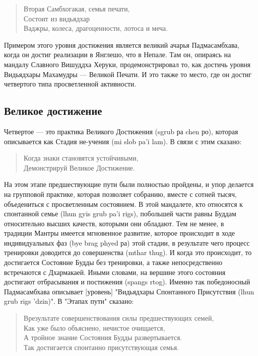 \begin{verse}
Вторая Самбхогакая, семья печати,\\
Состоит из видьядхар\\
Ваджры, колеса, драгоценности, лотоса и меча.
\end{verse}

Примером этого уровня достижения является великий ачарья Падмасамбхава, когда
он достиг реализации в Янглешо, что в Непале. Там он, опираясь на мандалу Славного
Вишуддха Херуки, продемонстрировал то, как достичь уровня Видьядхары Махамудры —
Великой Печати. И это также то место, где он достиг четвертого типа просветленной
активности.

\subsection{Великое достижение}

Четвертое — это практика Великого Достижения (sgrub ра chen ро), которая
описывается как Стадия не-учения (mi slob pa'i lam). В связи с этим сказано:

\begin{verse}
Когда знаки становятся устойчивыми,\\
Демонстрируй Великое Достижение.
\end{verse}

На этом этапе предшествующие пути были полностью пройдены, и упор делается на
групповой практике, которая позволяет собранию, вместе с сотней тысяч, объедениться с
просветленным состоянием. В этой мандалете, кто относятся к спонтанной семье (lhun gyis
grub pa'i rigs), побольшей части равны Буддам относительно высших качеств, которыми они
обладают. Тем не менее, в традиции Мантры имеется мгновенное развитие, которое
происходит в ходе индивидуальных фаз (bye brag phyed ра) этой стадии, в результате чего
процесс тренировки доводится до совершенства (mthar thug). И когда это происходит, то
достигается Состояние Будды без тренировки, а также непосредственно встречаются с
Дхармакаей. Иными словами, на вершине этого состояния достигают отбрасывания и
постижения (spangs rtog). Именно так победоносный Падмасамбхава описывает [уровень]
"Видьядхары Спонтанного Присутствия (lhun grub rigs 'dzin)". В "Этапах пути" сказано:

\begin{verse}
Врезультате совершенствования силы предшествующих семей,\\
Как уже было объяснено, нечистое очищается,\\
А тройное знание Состояния Будды развертывается.\\
Так достигается спонтанно присутствующая семья.
\end{verse}


